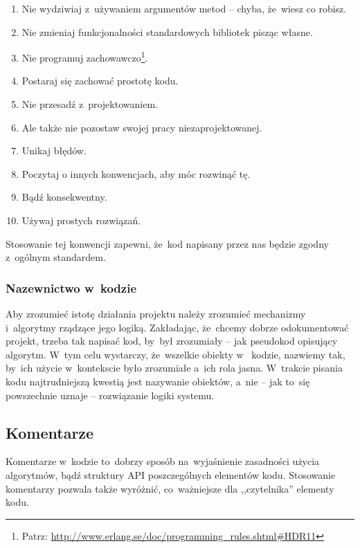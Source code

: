 \begin{enumerate}
\begin{enumerate}
    \item Nie wydziwiaj z~używaniem argumentów metod -- chyba, że~wiesz co robisz.
    \item Nie zmieniaj funkcjonalności standardowych bibliotek pisząc własne.
    \item Nie programuj zachowawczo\footnote{Patrz: \url{http://www.erlang.se/doc/programming\_rules.shtml\#HDR11}}.
    \item Postaraj się zachować prostotę kodu.
    \item Nie przesadź z~projektowaniem.
    \item Ale także nie pozostaw swojej pracy niezaprojektowanej.
    \item Unikaj błędów.
    \item Poczytaj o innych konwencjach, aby móc rozwinąć tę.
    \item Bądź konsekwentny.
    \item Używaj prostych rozwiązań.
  \end{enumerate}
\end{enumerate}

Stosowanie tej konwencji zapewni, że~kod napisany przez nas będzie zgodny z~ogólnym standardem.

\subsubsection{Nazewnictwo w~kodzie} \label{dokumentacja.nazewnictwo}

Aby zrozumieć istotę działania projektu należy zrozumieć mechanizmy i~algorytmy rządzące jego logiką. Zakładając, że~chcemy dobrze odokumentować projekt, trzeba tak napisać kod, by~był zrozumiały -- jak pseudokod opisujący algorytm. W~tym celu wystarczy, że~wszelkie obiekty w~ kodzie, nazwiemy tak, by~ich użycie w~kontekscie było zrozumiałe a~ich rola jasna. W~trakcie pisania kodu najtrudniejszą kwestią jest nazywanie obiektów, a~nie -- jak to~się powszechnie uznaje -- rozwiązanie logiki systemu.

\subsection{Komentarze} \label{dokumentacja.komentarze}

Komentarze w~kodzie to~dobrzy sposób na~wyjaśnienie zasadności użycia algorytmów, bądź struktury API poszczególnych elementów kodu. Stosowanie komentarzy pozwala także wyróżnić, co~ważniejsze dla ,,czytelnika'' elementy kodu.

